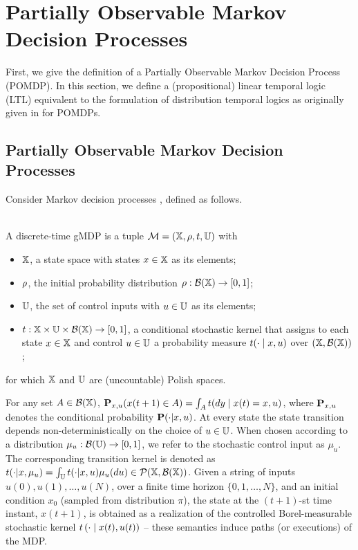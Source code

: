 \documentclass{ifacconf}
\begin{document}
    
 
\section{Partially Observable Markov Decision Processes}

First, we give the definition of a Partially Observable Markov Decision Process (POMDP). In this section, we define a (propositional) linear temporal logic (LTL)  equivalent to the formulation of distribution temporal logics as originally given in \citep{JonesDTL2013} for POMDPs. 

\subsection{Partially Observable Markov  Decision Processes}
Consider Markov decision processes \citep{Bertsekas2012,mt1993,hll1996}, defined as follows.%
\begin{definition}\label{def:MDP} \mbox{ }\\
  A discrete-time gMDP is a tuple $\mathcal{M} = ({\mathbb{X}}, \rho, t, {\mathbb{U}})$ with
  \begin{itemize}
    \item ${\mathbb{X}}$,  a state space with states $x\in{\mathbb{X}}$ as its elements;
    \item $\rho$, the initial probability distribution $\rho:\mathcal{B}({\mathbb{X}})\rightarrow [0,1]$;
    \item ${\mathbb{U}}$, the set of control inputs with $u\in{\mathbb{U}}$ as its elements;
    \item $t:{\mathbb{X}}\times{\mathbb{U}}\times\mathcal B({\mathbb{X}})\rightarrow[0,1]$, a conditional stochastic kernel that assigns to each state $x\in {\mathbb{X}}$ and control $u\in {\mathbb{U}}$ a probability measure $t(\cdot\mid x,u)$ over $({\mathbb{X}},\mathcal B({\mathbb{X}}))$;
  \end{itemize}
  for which ${\mathbb{X}}$ and ${\mathbb{U}}$ are (uncountable) Polish spaces.
 \end{definition}
For any set $A\in \mathcal{B}({\mathbb{X}})$, $\po_{x,u}(x(t+1)\in A)=\int_A \tr(dy\mid x(t)=x,u)$, where $\mathbf{P}_{x,u}$ denotes the conditional probability $\mathbf{P}(\cdot{\mid} x,u)$.
At every state the state transition depends non-deterministically on the choice of $u\in {\mathbb{U}}$.
When chosen according to
a distribution  $\mu_u:\mathcal{B}({\mathbb{U}})\rightarrow [0,1]$, we refer to the stochastic control input as $\mu_u$. 
The corresponding transition kernel is denoted as $\tr(\cdot| x, \mu_u)=\int_\U \tr(\cdot| x, u) \mu_u(du)\in \mathcal P(\X,\mathcal B(\X))$.
Given a string of inputs
$u(0), u(1), \ldots, u(N)$,
over a finite time horizon $\{0,1,\ldots, N\}$,
and an initial condition  $x_0$ (sampled from distribution $\pi$),
the state at the $(t+1)$-st time instant, $x(t+1)$,
is obtained as a realization of the controlled Borel-measurable stochastic kernel $t\left(\cdot\mid x(t), u(t) \right)$ --
these semantics induce paths (or executions) of the MDP.
 
\end{document}
